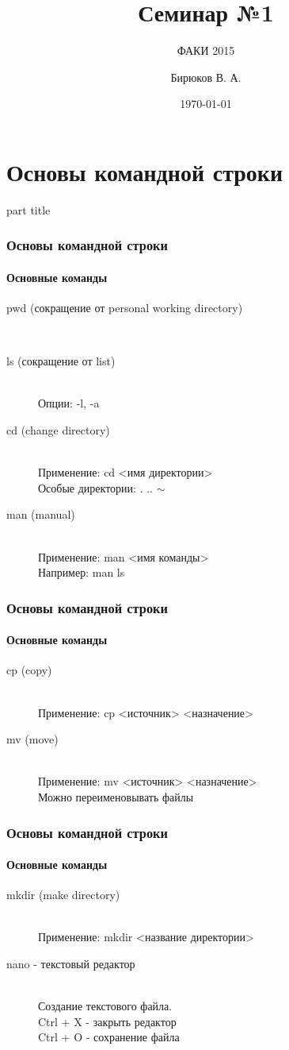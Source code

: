 \documentclass[14pt,pdf,hyperref={unicode}]{beamer}
\title{Семинар №1}
\subtitle{ФАКИ 2015}
\author{Бирюков В. А.}
\date{\today}
\begin{document}
\begin{frame}
\titlepage
\end{frame} 

\section{Основы командной строки}
\begin{frame}
\begin{center}
\begin{beamercolorbox}[sep=8pt,center]{part
title}
\insertsection
\end{beamercolorbox}
\end{center}
\end{frame}

\begin{frame}
\frametitle{Основы командной строки} 
\framesubtitle{Основные команды}
\begin{description}
  \item[pwd (сокращение от personal working directory)] \hfill \\
  \item[ls (сокращение от list)] \hfill \\
  Опции: -l, -a
  \item[cd (change directory)] \hfill \\
  Применение: cd <имя директории> \\
  Особые директории: . ..  $\sim$
  \item[man (manual)] \hfill \\
  Применение: man <имя команды>\\
  Например: man ls
\end{description}
\end{frame}

\begin{frame}
\frametitle{Основы командной строки} 
\framesubtitle{Основные команды}
\begin{description}
  \item[cp (copy)] \hfill \\
  Применение: cp <источник> <назначение>
  \item[mv (move)] \hfill \\
  Применение: mv <источник> <назначение>\\
  Можно переименовывать файлы
\end{description}
\end{frame}

\begin{frame}
\frametitle{Основы командной строки} 
\framesubtitle{Основные команды}
\begin{description}
  \item[mkdir (make directory)] \hfill \\
  Применение: mkdir <название директории>
  \item[nano - текстовый редактор] \hfill \\
  Создание текстового файла.\\
  Ctrl + X - закрыть редактор\\
  Ctrl + O - сохранение файла
\end{description}
\end{frame}
\end{document}
